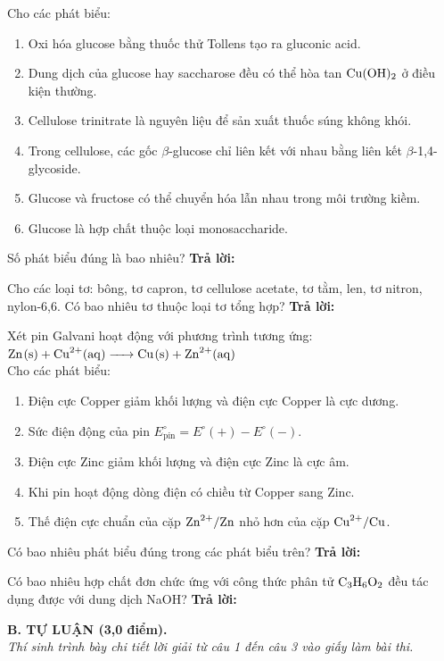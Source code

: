\documentclass[11pt,a4paper]{article}
\begin{document}
\begin{ex}
Cho các phát biểu:
\begin{enumerate}[label=(\alph*),leftmargin=20pt,itemsep=1pt]
\item Oxi hóa glucose bằng thuốc thử Tollens tạo ra gluconic acid.
\item Dung dịch của glucose hay saccharose đều có thể hòa tan $\ce{Cu(OH)2}$ ở điều kiện thường.
\item Cellulose trinitrate là nguyên liệu để sản xuất thuốc súng không khói.
\item Trong cellulose, các gốc $\beta$-glucose chỉ liên kết với nhau bằng liên kết $\beta$-1,4-glycoside.
\item Glucose và fructose có thể chuyển hóa lẫn nhau trong môi trường kiềm.
\item Glucose là hợp chất thuộc loại monosaccharide.
\end{enumerate}
Số phát biểu đúng là bao nhiêu?
\hfill \textbf{Trả lời:} \dotfill
\end{ex}
\begin{ex}
Cho các loại tơ: bông, tơ capron, tơ cellulose acetate, tơ tằm, len, tơ nitron, nylon-6,6. Có bao nhiêu tơ thuộc loại tơ tổng hợp?
\hfill \textbf{Trả lời:} \dotfill
\end{ex}
\begin{ex}
Xét pin Galvani hoạt động với phương trình tương ứng: $\ce{Zn(s) + Cu^2+(aq) -> Cu(s) + Zn^2+(aq)}$\\
Cho các phát biểu:
\begin{enumerate}[label=(\alph*),leftmargin=20pt,itemsep=1pt]
\item Điện cực Copper giảm khối lượng và điện cực Copper là cực dương.
\item Sức điện động của pin $E^\circ_\text{pin} = E^\circ(+) - E^\circ(-)$.
\item Điện cực Zinc giảm khối lượng và điện cực Zinc là cực âm.
\item Khi pin hoạt động dòng điện có chiều từ Copper sang Zinc.
\item Thế điện cực chuẩn của cặp $\ce{Zn^2+}/\ce{Zn}$ nhỏ hơn của cặp $\ce{Cu^2+}/\ce{Cu}$.
\end{enumerate}
Có bao nhiêu phát biểu đúng trong các phát biểu trên?
\hfill \textbf{Trả lời:} \dotfill
\end{ex}
\begin{ex}
Có bao nhiêu hợp chất đơn chức ứng với công thức phân tử $\ce{C3H6O2}$ đều tác dụng được với dung dịch NaOH?
\hfill \textbf{Trả lời:} \dotfill
\end{ex}
\vspace{4pt}
\noindent
{\color{mainGreen}\textbf{\Large B. TỰ LUẬN (3,0 điểm).}}\\
\textit{\small Thí sinh trình bày chi tiết lời giải từ câu 1 đến câu 3 vào giấy làm bài thi.}
\vspace{3pt}
\end{document}

